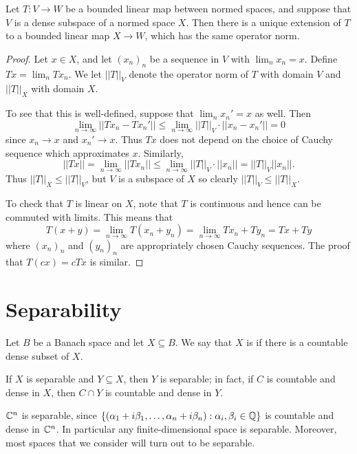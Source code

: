 \begin{lemma}
\label{linear extension}
Let $T: V \to W$ be a bounded linear map between normed spaces, and suppose that $V$ is a dense subspace of a normed space $X$.
Then there is a unique extension of $T$ to a bounded linear map $X \to W$, which has the same operator norm.
\end{lemma}
\begin{proof}
Let $x \in X$, and let $(x_{n})_{n}$ be a sequence in $V$ with $\lim_{n} x_{n} = x$.
Define $Tx = \lim_{n} Tx_{n}$.
We let $||T||_V$ denote the operator norm of $T$ with domain $V$ and $||T||_X$ with domain $X$.

To see that this is well-defined, suppose that $\lim_{n} x_{n}' = x$ as well. Then
\[\lim_{n \to \infty} ||Tx_{n} - Tx_{n}'|| \leq \lim_{n \to \infty} ||T||_{V} \cdot||x_{n} - x_{n}'|| = 0\]
since $x_{n} \to x$ and $x_{n}' \to x$.
Thus $Tx$ does not depend on the choice of Cauchy sequence which approximates $x$.
Similarly,
\[||Tx|| = \lim_{n \to \infty} ||Tx_{n}|| \leq \lim_{n \to \infty} ||T||_{V} \cdot||x_{n}|| = ||T||_{V} ||x_{n}||.\]
Thus $||T||_{X} \leq ||T||_V$, but $V$ is a subspace of $X$ so clearly $||T||_{V} \leq ||T||_X$.

To check that $T$ is linear on $X$, note that $T$ is continuous and hence can be commuted with limits. This means that
\[T(x + y) = \lim_{n \to \infty} T(x_{n} + y_{n}) = \lim_{n \to \infty} Tx_{n} + Ty_{n} = Tx + Ty\]
where $(x_{n})_{n}$ and $(y_{n})_{n}$ are appropriately chosen Cauchy sequences.
The proof that $T(cx) = cTx$ is similar.
\end{proof}

\section{Separability}
\begin{definition}
Let $B$ be a Banach space and let $X \subseteq B$. We say that $X$ is  if there is a countable dense subset of $X$.
\end{definition}

\begin{subsec}
If $X$ is separable and $Y \subseteq X$, then $Y$ is separable; in fact, if $C$ is countable and dense in $X$, then $C \cap Y$ is countable and dense in $Y$.
\end{subsec}

\begin{example}
$\mathbb{C}^n$ is separable, since $\{(\alpha_1 + i\beta_1, \dots, \alpha_{n} + i \beta_{n}): \alpha_i, \beta_{i} \in \mathbb{Q}\}$ is countable and dense in $\mathbb{C}^n$.
In particular any finite-dimensional space is separable. Moreover, most spaces that we consider will turn out to be separable.
\end{example}

